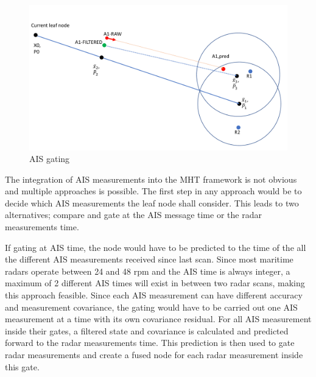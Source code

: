 \begin{figure}
\centering
\includegraphics[width = .8\textwidth]{Figures/AIS_gating.pdf}
\caption{AIS gating}\label{fig:ais_gating}
\end{figure}

The integration of AIS measurements into the MHT framework is not obvious and multiple approaches is possible. The first step in any approach would be to decide which AIS measurements the leaf node shall consider. This leads to two alternatives; compare and gate at the AIS message time or the radar measurements time. 

If gating at AIS time, the node would have to be predicted to the time of the all the different AIS measurements received since last scan. Since most maritime radars operate between 24 and 48 \gls{rpm} and the AIS time is always integer, a maximum of 2 different AIS times will exist in between two radar scans, making this approach feasible. Since each AIS measurement can have different accuracy and measurement covariance, the gating would have to be carried out one AIS measurement at a time with its own covariance residual. For all AIS measurement inside their gates, a filtered state and covariance is calculated and predicted forward to the radar measurements time. This prediction is then used to gate radar measurements and create a fused node for each radar measurement inside this gate.




